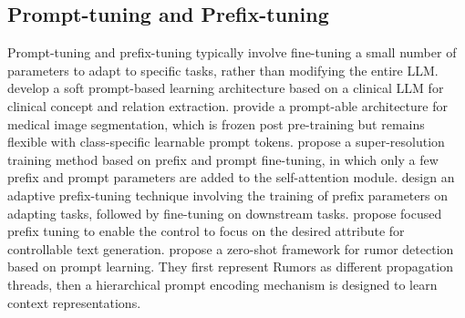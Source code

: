 

\subsection{Prompt-tuning and Prefix-tuning}

Prompt-tuning \cite{lester2021power} and prefix-tuning \cite{li2021prefix} typically involve fine-tuning a small number of parameters to adapt to specific tasks, rather than modifying the entire LLM. \citet{peng2024model} develop a soft prompt-based learning architecture based on a clinical LLM for clinical concept and relation extraction. \citet{fischer2024prompt} provide a prompt-able architecture for medical image segmentation, which is frozen post pre-training but remains flexible with class-specific learnable prompt tokens. \citet{ma2024image} propose a super-resolution training method based on prefix and prompt fine-tuning, in which only a few prefix and prompt parameters are added to the self-attention module. \citet{wu2024apt} design an adaptive prefix-tuning technique involving the training of prefix parameters on adapting tasks, followed by fine-tuning on downstream tasks. \citet{ma2024focused} propose focused prefix tuning to enable the control to focus on the desired attribute for controllable text generation. \citet{lin2023zero} propose a zero-shot framework for rumor detection based on prompt learning. They first represent Rumors as different propagation threads, then a hierarchical prompt encoding mechanism is designed to learn context representations.
